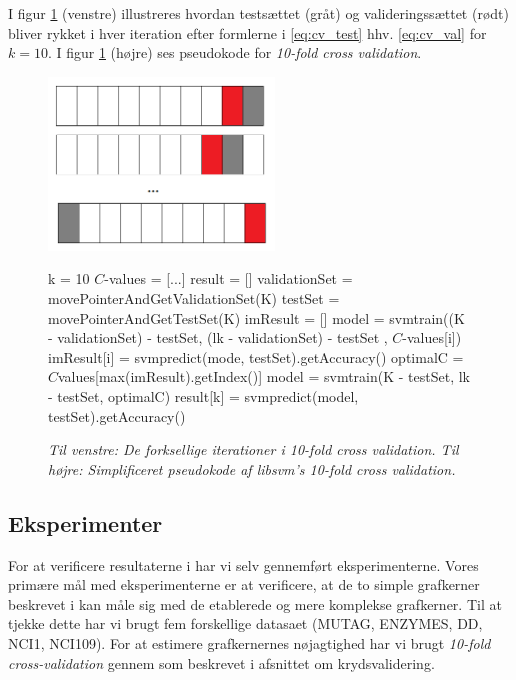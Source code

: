 \documentclass{article}
\begin{document}
I figur \ref{fig:cross_validation} (venstre) illustreres hvordan testsættet (gråt) og valideringssættet (rødt) bliver rykket i hver iteration efter formlerne i \ref{eq:cv_test} hhv. \ref{eq:cv_val} for $k=10$. I figur \ref{fig:cross_validation} (højre) ses pseudokode for \textit{10-fold cross validation}. \\

\begin{figure}[H]
	\begin{minipage}{0.5\linewidth}
		\includegraphics[width=6cm]{10-fold-cross-validation_3}
	\end{minipage}
	\begin{minipage}{0.7\linewidth}
		\begin{algorithmic}[1]
				\State k = 10
				\State $C$-values = [...]
				\State result = []
					\State validationSet = movePointerAndGetValidationSet(K)
					\State testSet = movePointerAndGetTestSet(K)
					\State imResult = []
						\State model = svmtrain((K - validationSet) - testSet, (lk - validationSet) - testSet , $C$-values[i])
						\State imResult[i] = svmpredict(mode, testSet).getAccuracy()
					\EndFor
					\State optimalC = $C$values[max(imResult).getIndex()]
					\State model = svmtrain(K - testSet, lk - testSet, optimalC)
					\State result[k] = svmpredict(model, testSet).getAccuracy()
				\EndFor
				\State {}
			\EndFunction
		\end{algorithmic}
	\end{minipage}
\caption{\textit{Til venstre: De forksellige iterationer i 10-fold cross validation. Til højre: Simplificeret pseudokode af libsvm's 10-fold cross validation.}}
\label{fig:cross_validation}
\end{figure}


\subsection{Eksperimenter}
For at verificere resultaterne i \cite{trivial-kernels} har vi selv gennemført eksperimenterne.
Vores primære mål med eksperimenterne er at verificere, at de to simple grafkerner beskrevet i \cite{trivial-kernels} kan måle sig med de etablerede og mere komplekse grafkerner. Til at tjekke dette har vi brugt fem forskellige datasaet (MUTAG, ENZYMES, DD, NCI1, NCI109). For at estimere grafkernernes nøjagtighed har vi brugt \textit{10-fold cross-validation} gennem \cite{libsvm} som beskrevet i afsnittet om krydsvalidering. 
\end{document}
